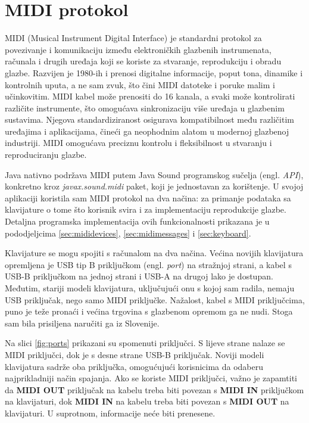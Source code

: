 \documentclass[diplomskirad, upload]{fer}
\begin{document}
\section{MIDI protokol}
\label{sec:midi}
MIDI (Musical Instrument Digital Interface) \cite{midi} je standardni protokol za povezivanje i komunikaciju između elektroničkih glazbenih instrumenata, računala i drugih uređaja koji se koriste za stvaranje, reprodukciju i obradu glazbe. Razvijen je 1980-ih i prenosi digitalne informacije, poput tona, dinamike i kontrolnih uputa, a ne sam zvuk, što čini MIDI datoteke i poruke malim i učinkovitim. MIDI kabel može prenositi do 16 kanala, a svaki može kontrolirati različite instrumente, što omogućava sinkronizaciju više uređaja u glazbenim sustavima. Njegova standardiziranost osigurava kompatibilnost među različitim uređajima i aplikacijama, čineći ga neophodnim alatom u modernoj glazbenoj industriji. MIDI omogućava preciznu kontrolu i fleksibilnost u stvaranju i reproduciranju glazbe.

Java nativno podržava MIDI putem Java Sound programskog sučelja (engl. \textit{API}), konkretno kroz \textit{javax.sound.midi} paket, koji je jednostavan za korištenje. U svojoj aplikaciji koristila sam MIDI protokol na dva načina: za primanje podataka sa klavijature o tome što korisnik svira i za implementaciju reprodukcije glazbe. Detaljna programska implementacija ovih funkcionalnosti prikazana je u pododjeljcima \ref{sec:mididevices}, \ref{sec:midimessages} i \ref{sec:keyboard}.

Klavijature se mogu spojiti s računalom na dva načina. Većina novijih klavijatura opremljena je USB tip B priključkom (engl. \textit{port}) na stražnjoj strani, a kabel s USB-B priključkom na jednoj strani i USB-A na drugoj lako je dostupan. Međutim, stariji modeli klavijatura, uključujući onu s kojoj sam radila, nemaju USB priključak, nego samo MIDI priključke. Nažalost, kabel s MIDI priključcima, puno je teže pronaći i većina trgovina s glazbenom opremom ga ne nudi. Stoga sam bila prisiljena naručiti ga iz Slovenije.

Na slici \ref{fig:ports} prikazani su spomenuti priključci. S lijeve strane nalaze se MIDI priključci, dok je s desne strane USB-B priključak. Noviji modeli klavijatura sadrže oba priključka, omogućujući korisnicima da odaberu najprikladniji način spajanja. Ako se koriste MIDI priključci, važno je zapamtiti da \textbf{MIDI OUT} priključak na kabelu treba biti povezan s \textbf{MIDI IN} priključkom na klavijaturi, dok \textbf{MIDI IN} na kabelu treba biti povezan s \textbf{MIDI OUT} na klavijaturi. U suprotnom, informacije neće biti prenesene.
\end{document}
